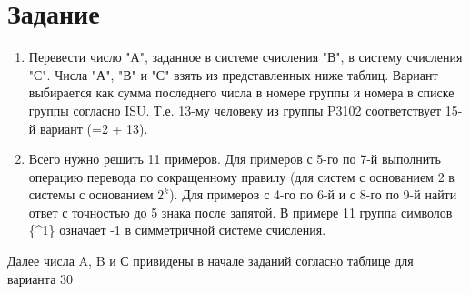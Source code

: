 \documentclass[11pt]{article}
\begin{document}
\section{Задание}
\begin{enumerate}
    \item Перевести число "А", заданное в системе счисления "В", в систему
счисления "С". Числа "А", "В" и "С" взять из представленных ниже
таблиц. Вариант выбирается как сумма последнего числа в номере
группы и номера в списке группы согласно ISU. Т.е. 13-му человеку
из группы P3102 соответствует 15-й вариант (=2 + 13).
    \item Всего нужно решить 11 примеров. Для примеров с 5-го по 7-й
выполнить операцию перевода по сокращенному правилу (для систем
с основанием 2 в системы с основанием $2^k$). Для примеров с 4-го по
6-й и с 8-го по 9-й найти ответ с точностью до 5 знака после запятой.
В примере 11 группа символов \{\^{}1\} означает -1 в симметричной
системе счисления.
\end{enumerate}
Далее числа A, B и С привидены в начале заданий согласно таблице для варианта 30\\
\pagebreak{}
\end{document}
